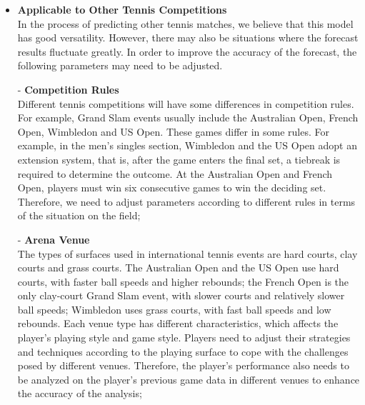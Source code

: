 \begin{itemize}
    \item \textbf{Applicable to Other Tennis Competitions}\\
    In the process of predicting other tennis matches, we believe that this model has good versatility. However, there may also be situations where the forecast results fluctuate greatly. In order to improve the accuracy of the forecast, the following parameters may need to be adjusted.

- \textbf{Competition Rules}\\
    Different tennis competitions will have some differences in competition rules. For example, Grand Slam events usually include the Australian Open, French Open, Wimbledon and US Open. These games differ in some rules. For example, in the men's singles section, Wimbledon and the US Open adopt an extension system, that is, after the game enters the final set, a tiebreak is required to determine the outcome. At the Australian Open and French Open, players must win six consecutive games to win the deciding set. Therefore, we need to adjust parameters according to different rules in terms of the situation on the field;

- \textbf{Arena Venue}\\
   The types of surfaces used in international tennis events are hard courts, clay courts and grass courts. The Australian Open and the US Open use hard courts, with faster ball speeds and higher rebounds; the French Open is the only clay-court Grand Slam event, with slower courts and relatively slower ball speeds; Wimbledon uses grass courts, with fast ball speeds and low rebounds. Each venue type has different characteristics, which affects the player's playing style and game style. Players need to adjust their strategies and techniques according to the playing surface to cope with the challenges posed by different venues. Therefore, the player's performance also needs to be analyzed on the player's previous game data in different venues to enhance the accuracy of the analysis;


\end{itemize}
